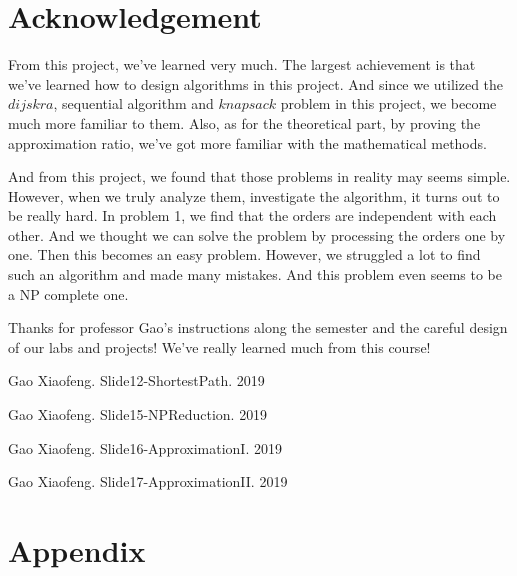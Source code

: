 \documentclass[11pt, a4paper]{article} %
\begin{document}
\newpage %
\section{Acknowledgement}
From this project, we've learned very much. The largest achievement is that we've learned how to design algorithms in this project. And since we utilized the $dijskra$, sequential algorithm and $knapsack$ problem in this project, we become much more familiar to them. Also, as for the theoretical part, by proving the approximation ratio, we've got more familiar with the mathematical methods.

And from this project, we found that those problems in reality may seems simple. However, when we truly analyze them, investigate the algorithm, it turns out to be really hard. In problem 1, we find that the orders are independent with each other. And we thought we can solve the problem by processing the orders one by one. Then this becomes an easy problem. However, we struggled a lot to find such an algorithm and made many mistakes. And this problem even seems to be a NP complete one.

Thanks for professor Gao's instructions along the semester and the careful design of our labs and projects! We've really learned much from this course!


\newpage %
%


\begin{thebibliography}{99}
	 Gao Xiaofeng. Slide12-ShortestPath. 2019
	
	 Gao Xiaofeng. Slide15-NPReduction. 2019
	
	 Gao Xiaofeng. Slide16-ApproximationI. 2019
	
	 Gao Xiaofeng. Slide17-ApproximationII. 2019
\end{thebibliography}

\newpage %
\section*{Appendix} %
\end{document}
